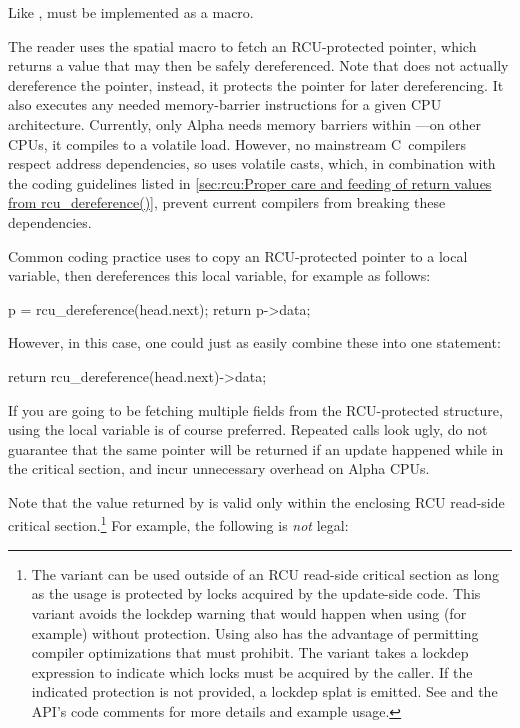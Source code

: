 \begin{description}
	Like ,  must be implemented
	as a macro.

	The reader uses the spatial  macro to fetch
	an RCU-protected pointer, which returns a value that may
	then be safely dereferenced.
	Note that 
	does not actually dereference the pointer, instead, it
	protects the pointer for later dereferencing.
	It also
	executes any needed memory-barrier instructions for a given
	CPU architecture.
	Currently, only Alpha needs memory barriers
	within ---on other CPUs, it compiles to a
	volatile load.
	However, no mainstream C~compilers respect
	address dependencies, so  uses volatile casts,
	which, in combination with the coding guidelines listed in
	\cref{sec:rcu:Proper care and feeding of return values from rcu_dereference()},
	prevent current compilers from breaking
	these dependencies.

	Common coding practice uses  to copy an
	RCU-protected pointer to a local variable, then dereferences
	this local variable, for example as follows:

\begin{VerbatimU}
		p = rcu_dereference(head.next);
		return p->data;
\end{VerbatimU}

	However, in this case, one could just as easily combine these
	into one statement:

\begin{VerbatimU}
		return rcu_dereference(head.next)->data;
\end{VerbatimU}

	If you are going to be fetching multiple fields from the
	RCU-protected structure, using the local variable is of
	course preferred.
	Repeated  calls look
	ugly, do not guarantee that the same pointer will be returned
	if an update happened while in the critical section, and incur
	unnecessary overhead on Alpha CPUs.

	Note that the value returned by  is valid
	only within the enclosing RCU read-side critical section.\footnote{
		The variant  can be used outside
		of an RCU read-side critical section as long as the usage is
		protected by locks acquired by the update-side code.
		This variant
		avoids the lockdep warning that would happen when using (for
		example)  without  protection.
		Using  also has the advantage
		of permitting compiler optimizations that 
		must prohibit.
		The  variant takes
		a lockdep expression to indicate which locks must be acquired
		by the caller.
		If the indicated protection is not provided,
		a lockdep splat is emitted.
		See 
		and the API's code comments for more details and example usage.}
	For example, the following is \emph{not} legal:


\end{description}
